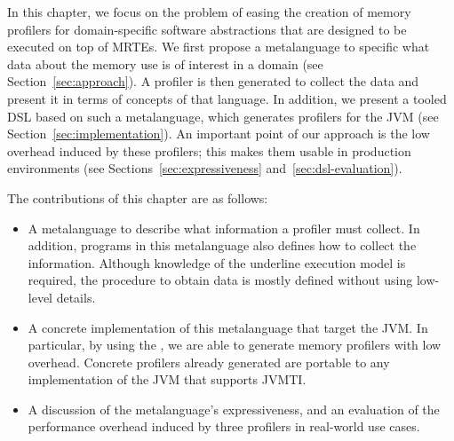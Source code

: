 In this chapter, we focus on the problem of easing the creation of memory profilers for domain-specific software abstractions that are designed to be executed on top of MRTEs. 
We first propose a metalanguage to specific what data about the memory use is of interest in a domain (see Section~\ref{sec:approach}).
A profiler is then generated to collect the data and present it in terms of concepts of that language. 
In addition, we present a tooled DSL based on such a metalanguage, which generates profilers for the JVM (see Section~\ref{sec:implementation}).
An important point of our approach is the low overhead induced by these profilers; this makes them usable in production environments (see Sections~\ref{sec:expressiveness} and~\ref{sec:dsl-evaluation}).

The contributions of this chapter are as follows:
\begin{itemize}
\item A metalanguage to describe what information a profiler must collect.
In addition, programs in this metalanguage also defines how to collect the information.
Although knowledge of the underline execution model is required, the procedure to obtain data is mostly defined without using low-level details.  

\item A concrete implementation of this metalanguage that target the JVM.
In particular, by using the , we are able to generate memory profilers with low overhead.
Concrete profilers already generated are portable to any implementation of the JVM that supports JVMTI.

\item A discussion of the metalanguage's expressiveness, and an evaluation of the performance overhead induced by three profilers in real-world use cases.
\end{itemize}

